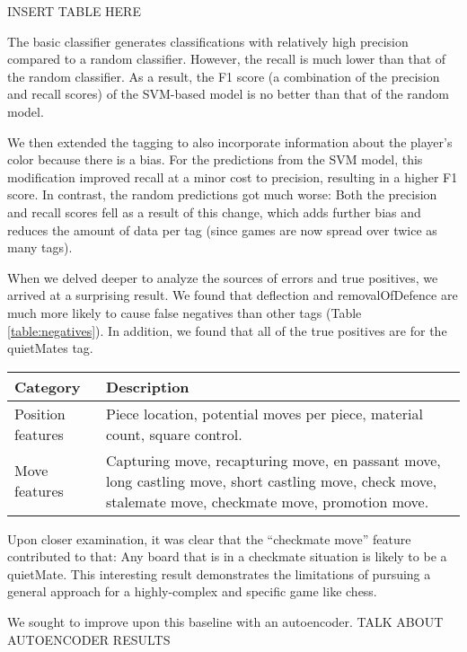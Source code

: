 \documentclass[11pt]{article}
\begin{document}
INSERT TABLE HERE

The basic classifier generates classifications with relatively high precision compared to a random classifier. However, the recall is much lower than that of the random classifier. As a result, the F1 score (a combination of the precision and recall scores) of the SVM-based model is no better than that of the random model.

We then extended the tagging to also incorporate information about the player’s color because there is a bias. For the predictions from the SVM model, this modification improved recall at a minor cost to precision, resulting in a higher F1 score. In contrast, the random predictions got much worse: Both the precision and recall scores fell as a result of this change, which adds further bias and reduces the amount of data per tag (since games are now spread over twice as many tags).

When we delved deeper to analyze the sources of errors and true positives, we arrived at a surprising result. We found that deflection and removalOfDefence are much more likely to cause false negatives than other tags (Table \ref{table:negatives}). In addition, we found that all of the true positives are for the quietMates tag.

\begin{table*}
\centering
\begin{tabular}{lp{}}
\hline
\textbf{Category} & \textbf{Description} \\ \hline
Position features & Piece location, potential moves per piece, material count, square control. \\
Move features & Capturing move, recapturing move, en passant move, long castling move, short castling move, check move, stalemate move, checkmate move, promotion move. \\
\hline
\end{tabular} 
\caption{Sources of error in the SVM classifier.}
\label{table:negatives}
\end{table*}

Upon closer examination, it was clear that the “checkmate move” feature contributed to that: Any board that is in a checkmate situation is likely to be a quietMate. This interesting result demonstrates the limitations of pursuing a general approach for a highly-complex and specific game like chess.

We sought to improve upon this baseline with an autoencoder. TALK ABOUT AUTOENCODER RESULTS
\end{document}
